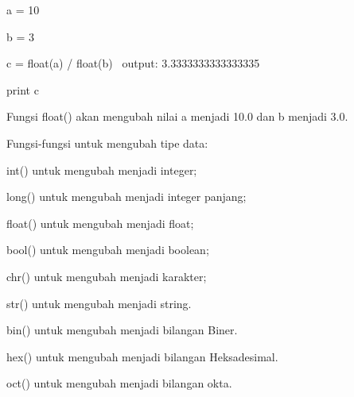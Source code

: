 \noindent 
a = 10 \par
\noindent 
b = 3 \par
\noindent 
c = float(a) / float(b)~ output: 3.3333333333333335 \par
\vspace{12pt}
\noindent 
print c \par
\vspace{12pt}
\noindent 
Fungsi $  $float() $  $akan mengubah nilai $  $a $  $menjadi $  $10.0 $  $dan $  $b $  $menjadi $  $3.0. \par
\vspace{12pt}
\noindent 
Fungsi-fungsi untuk mengubah tipe data: \par
\vspace{12pt}
\noindent 
int() $  $untuk mengubah menjadi integer; \par
\vspace{12pt}
\noindent 
long() $  $untuk mengubah menjadi integer panjang; \par
\vspace{12pt}
\noindent 
float() $  $untuk mengubah menjadi float; \par
\vspace{12pt}
\noindent 
bool() $  $untuk mengubah menjadi boolean; \par
\vspace{12pt}
\noindent 
chr() $  $untuk mengubah menjadi karakter; \par
\vspace{12pt}
\noindent 
str() $  $untuk mengubah menjadi string. \par
\vspace{12pt}
\noindent 
bin() $  $untuk mengubah menjadi bilangan Biner. \par
\vspace{12pt}
\noindent 
hex() $  $untuk mengubah menjadi bilangan Heksadesimal. \par
\vspace{12pt}
\noindent 
oct() $  $untuk mengubah menjadi bilangan okta. \par
\vspace{12pt}
\vspace{12pt}

